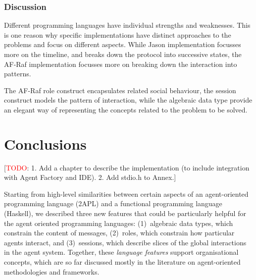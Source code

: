 \documentclass[a4paper,12pt,oneside,fleqn]{book} %
\newcommand{\todo}[1]{[\textcolor{red}{TODO}: #1]}
\begin{document}




\subsection{Discussion} %
Different programming languages have individual strengths and weaknesses.
This is one reason why specific implementations have distinct approaches to
the problems and focus on different aspects. While Jason implementation
focusses more on the timeline, and breaks down the protocol into successive
states, the AF-Raf implementation focusses more on breaking down the
interaction into patterns.

The AF-Raf role construct encapsulates related social behaviour, the
session construct models the pattern of interaction, while the algebraic
data type provide an elegant way of representing the concepts related to
the problem to be solved. 
\chapter{Conclusions}\label{ch:conc} %

\todo{1. Add a chapter to describe the implementation (to include integration
with Agent Factory and IDE). 2. Add stdio.h to Annex.}

Starting from high-level similarities between certain aspects of an
agent-oriented programming language (2APL) and a functional programming
language (Haskell), we described three new features that could be
particularly helpful for the agent oriented programming languages:
(1)~algebraic data types, which constrain the content of messages,
(2)~roles, which constrain how particular agents interact, and
(3)~sessions, which describe slices of the global interactions in the agent
system. Together, these \emph{language features} support organisational
concepts, which are so far discussed mostly in the literature on
agent-oriented methodologies and frameworks.
\end{document}
